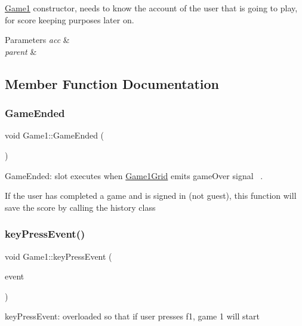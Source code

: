 \hyperlink{classGame1}{Game1} constructor, needs to know the account of the user that is going to play, for score keeping purposes later on. 


\begin{DoxyParams}{Parameters}
{\em acc} & \\
\hline
{\em parent} & \\
\hline
\end{DoxyParams}


\subsection{Member Function Documentation}
\mbox{\label{classGame1_acdc8a02eea6d4e76d60b655b30dd601f}} 
\subsubsection{\texorpdfstring{Game\+Ended}{GameEnded}}
{\footnotesize\ttfamily void Game1\+::\+Game\+Ended (\begin{DoxyParamCaption}{ }\end{DoxyParamCaption})\hspace{0.3cm}{\ttfamily [slot]}}



Game\+Ended\+: slot executes when \hyperlink{classGame1Grid}{Game1\+Grid} emits game\+Over signal~\newline
. 

If the user has completed a game and is signed in (not guest), this function will save the score by calling the history class \mbox{\label{classGame1_a1c1667a4c41a139217da796ca0f47fa6}} 
\subsubsection{\texorpdfstring{key\+Press\+Event()}{keyPressEvent()}}
{\footnotesize\ttfamily void Game1\+::key\+Press\+Event (\begin{DoxyParamCaption}\item[{Q\+Key\+Event $\ast$}]{event }\end{DoxyParamCaption})}



key\+Press\+Event\+: overloaded so that if user presses f1, game 1 will start 


